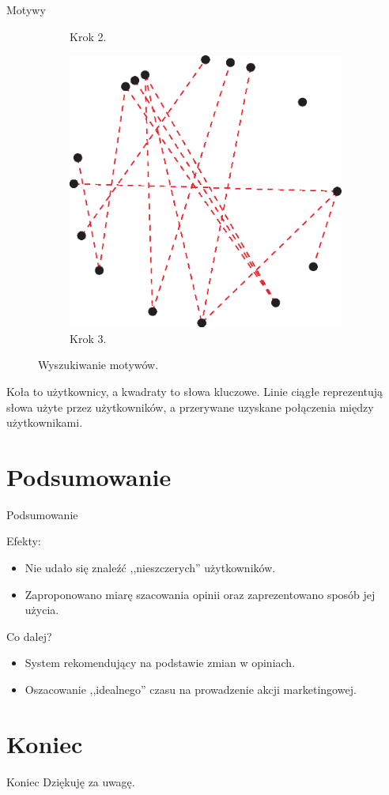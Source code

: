 \documentclass{beamer}
\begin{document}
\begin{frame}{Motywy}
\begin{figure}[h]
\begin{subfigure}[b]{0.3\textwidth}
      \caption{Krok 2.}
    \end{subfigure}
    \begin{subfigure}[b]{0.3\textwidth}
      \includegraphics[width=\textwidth]{cs_motif_3}
      \caption{Krok 3.}
    \end{subfigure}
    \caption{Wyszukiwanie motywów.}
  \end{figure}
  Koła to użytkownicy, a kwadraty to słowa kluczowe. Linie ciągłe reprezentują słowa użyte przez użytkowników, a przerywane uzyskane połączenia między użytkownikami.
\end{frame}

\section*{Podsumowanie}
\begin{frame}{Podsumowanie}
  \begin{block}{Efekty:}
    \begin{itemize}
      \item Nie udało się znaleźć ,,nieszczerych'' użytkowników.
      \item Zaproponowano miarę szacowania opinii oraz zaprezentowano sposób jej użycia.
    \end{itemize}
  \end{block}
  \pause
  \begin{block}{Co dalej?}
    \begin{itemize}
      \item System rekomendujący na podstawie zmian w opiniach.
      \item Oszacowanie ,,idealnego'' czasu na prowadzenie akcji marketingowej.
    \end{itemize}
  \end{block}
\end{frame}

\section*{Koniec}
\begin{frame}{Koniec}
\Huge Dziękuję za uwagę.
\end{frame}
\end{document}
